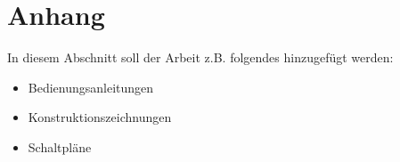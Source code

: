\chapter*{Anhang}
\label{cha:anhang}

In diesem Abschnitt soll der Arbeit z.B. folgendes hinzugef\"ugt werden:

\begin{itemize}
  \item Bedienungsanleitungen
  \item Konstruktionszeichnungen
  \item Schaltpl\"ane
\end{itemize}
